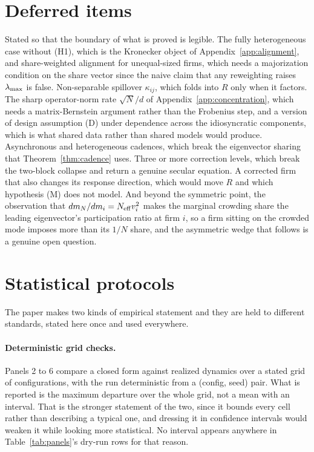 \section{Deferred items}
\label{app:deferred}

Stated so that the boundary of what is proved is legible. The fully heterogeneous case without (H1), which is the Kronecker object of Appendix~\ref{app:alignment}, and share-weighted alignment for unequal-sized firms, which needs a majorization condition on the share vector since the naive claim that any reweighting raises $\lambda_{\max}$ is false. Non-separable spillover $\kappa_{ij}$, which folds into $R$ only when it factors. The sharp operator-norm rate $\sqrt{N}/d$ of Appendix~\ref{app:concentration}, which needs a matrix-Bernstein argument rather than the Frobenius step, and a version of design assumption (D) under dependence across the idiosyncratic components, which is what shared data rather than shared models would produce. Asynchronous and heterogeneous cadences, which break the eigenvector sharing that Theorem~\ref{thm:cadence} uses. Three or more correction levels, which break the two-block collapse and return a genuine secular equation. A corrected firm that also changes its response direction, which would move $R$ and which hypothesis (M) does not model. And beyond the symmetric point, the observation that $dm_N/dm_i = N_{\mathrm{eff}} v_i^2$ makes the marginal crowding share the leading eigenvector's participation ratio at firm $i$, so a firm sitting on the crowded mode imposes more than its $1/N$ share, and the asymmetric wedge that follows is a genuine open question.

\section{Statistical protocols}
\label{app:statistics}

The paper makes two kinds of empirical statement and they are held to different standards, stated here once and used everywhere.

\paragraph{Deterministic grid checks.} Panels 2 to 6 compare a closed form against realized dynamics over a stated grid of configurations, with the run deterministic from a (config, seed) pair. What is reported is the maximum departure over the whole grid, not a mean with an interval. That is the stronger statement of the two, since it bounds every cell rather than describing a typical one, and dressing it in confidence intervals would weaken it while looking more statistical. No interval appears anywhere in Table~\ref{tab:panels}'s dry-run rows for that reason.

